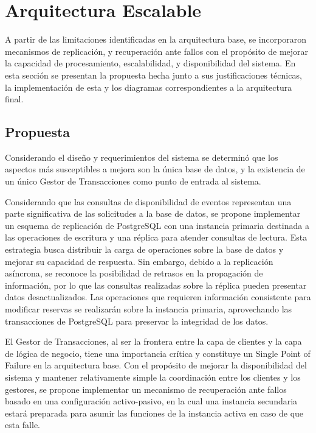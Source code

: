 \documentclass[conference]{IEEEtran}
\begin{document}
\section{Arquitectura Escalable}
A partir de las limitaciones identificadas en la arquitectura base, se incorporaron mecanismos de replicación,
y recuperación ante fallos con el propósito de mejorar la capacidad de procesamiento, escalabilidad,
y disponibilidad del sistema. En esta sección se presentan la propuesta hecha junto a sus justificaciones técnicas, la implementación de esta
y los diagramas correspondientes a la arquitectura final.

\subsection{Propuesta}
Considerando el diseño y requerimientos del sistema se determinó que
los aspectos más susceptibles a mejora son la única base de datos, y la existencia
de un único Gestor de Transacciones como punto de entrada al sistema.

Considerando que las consultas de disponibilidad de eventos representan una parte significativa de las solicitudes a la base de datos, se propone 
implementar un esquema de replicación de PostgreSQL con una instancia primaria destinada a las operaciones de escritura y una réplica para 
atender consultas de lectura. Esta estrategia busca distribuir la carga de operaciones sobre la base de datos y mejorar su capacidad de 
respuesta. Sin embargo, debido a la replicación asíncrona, se reconoce la posibilidad de retrasos en la propagación de información, por lo 
que las consultas realizadas sobre la réplica pueden presentar datos desactualizados. Las operaciones que requieren información consistente 
para modificar reservas se realizarán sobre la instancia primaria, aprovechando las transacciones de PostgreSQL para preservar la integridad de 
los datos.

El Gestor de Transacciones, al ser la frontera entre la capa de clientes 
y la capa de lógica de negocio, tiene una importancia crítica y constituye 
un Single Point of Failure en la arquitectura base. 
Con el propósito de mejorar la disponibilidad del sistema y mantener 
relativamente simple la coordinación entre los clientes y los gestores, 
se propone implementar un mecanismo de recuperación ante fallos basado 
en una configuración activo-pasivo, en la cual una instancia secundaria 
estará preparada para asumir las funciones de la instancia activa en caso 
de que esta falle.
\end{document}
